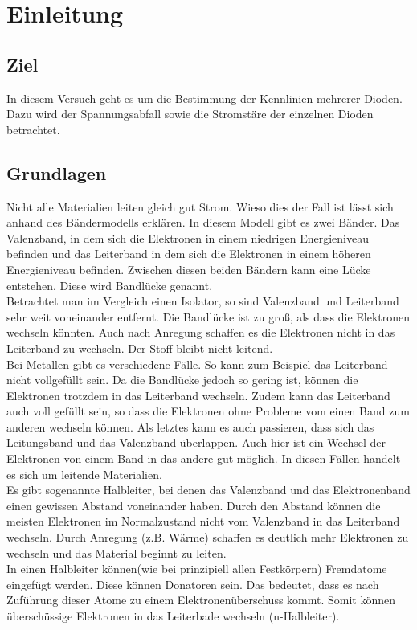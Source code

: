 \chapter{Einleitung}
\section{Ziel}
In diesem Versuch geht es um die Bestimmung der Kennlinien mehrerer Dioden. Dazu wird der Spannungsabfall  sowie die Stromstäre der einzelnen Dioden betrachtet.
\section{Grundlagen}
Nicht alle Materialien leiten gleich gut Strom. Wieso dies der Fall ist lässt sich anhand des Bändermodells erklären. In diesem Modell gibt es zwei Bänder. Das Valenzband, in dem sich die Elektronen in einem niedrigen Energieniveau befinden und das Leiterband in dem sich die Elektronen in einem höheren Energieniveau befinden. Zwischen diesen beiden Bändern kann eine Lücke entstehen. Diese wird Bandlücke genannt.\\
 Betrachtet man im Vergleich einen Isolator, so sind Valenzband und Leiterband sehr weit voneinander entfernt. Die Bandlücke ist zu groß, als dass die Elektronen wechseln könnten. Auch nach Anregung schaffen es die Elektronen nicht in das Leiterband zu wechseln. Der Stoff bleibt nicht leitend.\\
Bei Metallen gibt es verschiedene Fälle. So kann zum Beispiel das Leiterband nicht vollgefüllt sein. Da die Bandlücke jedoch so gering ist, können die Elektronen trotzdem in das Leiterband wechseln. Zudem kann das Leiterband auch voll gefüllt sein, so dass die Elektronen ohne Probleme vom einen Band zum anderen wechseln können. Als letztes kann es auch passieren, dass sich das Leitungsband und das Valenzband überlappen. Auch hier ist ein Wechsel der Elektronen von einem Band in das andere gut möglich. In diesen Fällen handelt es sich um leitende Materialien.\\ 
Es gibt sogenannte Halbleiter, bei denen das Valenzband und das Elektronenband einen gewissen Abstand voneinander haben. Durch den Abstand können die meisten Elektronen im Normalzustand nicht vom Valenzband in das Leiterband wechseln. Durch Anregung (z.B. Wärme) schaffen es deutlich mehr Elektronen zu wechseln und das Material beginnt zu leiten.\\
In einen Halbleiter können(wie bei prinzipiell allen Festkörpern) Fremdatome eingefügt werden. Diese können Donatoren sein. Das bedeutet, dass es nach Zuführung dieser Atome zu einem Elektronenüberschuss kommt. Somit können überschüssige Elektronen in das Leiterbade wechseln (n-Halbleiter). \\

